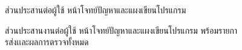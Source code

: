 \documentclass[12pt,oneside,openright,a4paper]{cpe-thai-project}
\begin{document}
    \hypertarget{ui-code1}{
        \begin{figure}[H]
        \centering
            \caption[ส่วนประสานต่อผู้ใช้ หน้าแผงเขียนโปรแกรม (1)]{ส่วนประสานต่อผู้ใช้ หน้าโจทย์ปัญหาและแผงเขียนโปรแกรม}
            \label{fig:ui-code1}
        \end{figure}
    }
    \hypertarget{ui-code2}{
        \begin{figure}[H]
        \centering
            \caption[ส่วนประสานต่อผู้ใช้ หน้าแผงเขียนโปรแกรม (2)]{ส่วนประสานงานต่อผู้ใช้ หน้าโจทย์ปัญหาและแผงเขียนโปรแกรม พร้อมรายการส่งเเละผลการตรวจทั้งหมด}
            \label{fig:ui-code2}
        \end{figure}
    }
    
\end{document}
